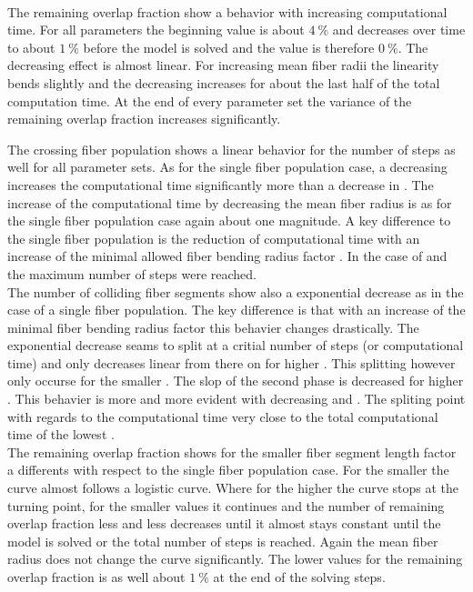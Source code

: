 \\
% 
The remaining overlap fraction show a behavior with increasing computational time.
For all parameters the beginning value is about $\SI{4}{\percent}$ and decreases over time to about $\SI{1}{\percent}$ before the model is solved and the value is therefore $\SI{0}{\percent}$.
The decreasing effect is almost linear.
For increasing mean fiber radii \fiberRadiusMean{} the linearity bends slightly and the decreasing increases for about the last half of the total computation time. 
At the end of every parameter set the variance of the remaining overlap fraction increases significantly.
\par
% 
The crossing fiber population shows a linear behavior for the number of steps as well for all parameter sets.
As for the single fiber population case, a decreasing \fiberRadiusMean{} increases the computational time significantly more than a decrease in \segLength{}.
The increase of the computational time by decreasing the mean fiber radius is as for the single fiber population case again about one magnitude.
A key difference to the single fiber population is the reduction of computational time with an increase of the minimal allowed fiber bending radius factor \segRadiusFactor{}.
In the case of \dummy{} and \dummy{} the maximum number of steps were reached.
\\
The number of colliding fiber segments show also a exponential decrease as in the case of a single fiber population.
The key difference is that with an increase of the minimal fiber bending radius factor \segRadiusFactor{} this behavier changes drastically.
The exponential decrease seams to split at a critial number of steps (or computational time) and only decreases linear from there on for higher \segRadiusFactor{}.
This splitting however only occurse for the smaller \segLengthFactor{}.
The slop of the second phase is decreased for higher \segRadiusFactor{}.
This behavier is more and more evident with decreasing \fiberRadiusMean{} and \segLengthFactor{}.
The spliting point with regards to the computational time very close to the total computational time of the lowest \segRadiusFactor{}.
\\
The remaining overlap fraction shows for the smaller fiber segment length factor  \segLengthFactor{} a differents with respect to the single fiber population case.
For the smaller \segLengthFactor{} the curve almost follows a logistic curve.
Where for the higher \segLengthFactor{} the curve stops at the turning point, for the smaller values it continues and the number of remaining overlap fraction less and less decreases until it almost stays constant until the model is solved or the total number of steps is reached.
Again the mean fiber radius \fiberRadiusMean{} does not change the curve significantly.
The lower values for the remaining overlap fraction is as well about $\SI{1}{\percent}$ at the end of the solving steps.
% 
% 
% 
